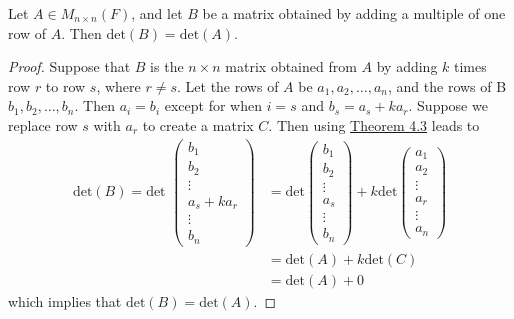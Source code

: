 \begin{theorem}
    Let \( A \in {M}_{n \times n}(F) \), and let \( B  \) be a matrix obtained by adding a multiple of one row of \( A  \). Then \( \text{det}(B) = \text{det}(A) \).
\end{theorem}
\begin{proof}
Suppose that \( B  \) is the \( n \times n \) matrix obtained from \( A  \) by adding \( k  \) times row \( r  \) to row \( s  \), where \( r  \neq s   \). Let the rows of \( A  \) be \( {a}_{1}, {a}_{2}, \dots , {a}_{n} \), and the rows of B \( {b}_{1}, {b}_{2}, \dots, {b}_{n}  \). Then \( {a}_{i} = {b}_{i} \) except for when \( i = s  \) and \( {b}_{s} = {a}_{s} + {ka}_{r} \). Suppose we replace row \( s  \) with \( {a}_{r} \) to create a matrix \( C  \). Then using {\hyperref[Theorem 4.3]{Theorem 4.3}} leads to 
\begin{align*}
    \text{det}(B) = \text{det } \begin{pmatrix} 
               {b}_{1} \\
               {b}_{2} \\
               \vdots \\
               {a}_{s} + {ka}_{r} \\
               \vdots \\
               {b}_{n}
              \end{pmatrix} 
                 &= \text{det} \begin{pmatrix} 
               {b}_{1} \\
               {b}_{2} \\
               \vdots \\
               {a}_{s} \\
               \vdots \\
               {b}_{n}
              \end{pmatrix} + k \text{det}\begin{pmatrix} 
                         {a}_{1} \\
                         {a}_{2} \\
                         \vdots \\
                         {a}_{r} \\
                         \vdots \\
                         {a}_{n}
                        \end{pmatrix}    \\
            &= \text{det}(A) + k \text{det}(C) \\
            &= \text{det}(A) + 0 \tag{Corollary to Theorem 4.4}
\end{align*}
which implies that \( \text{det}(B) = \text{det}(A) \).
\end{proof}

